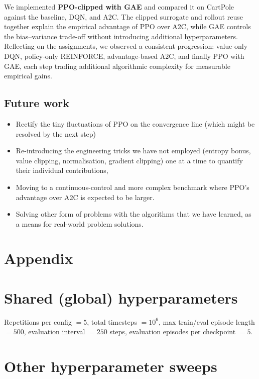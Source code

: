 \documentclass{article}
\theoremstyle{plain}
\theoremstyle{definition}
\theoremstyle{remark}
\begin{document}
We implemented \textbf{PPO-clipped with GAE} and compared it on CartPole against the baseline, DQN, and A2C. The clipped surrogate and rollout reuse together explain the empirical advantage of PPO over A2C, while GAE controls the bias--variance trade-off without introducing additional hyperparameters. Reflecting on the assignments, we observed a consistent progression: value-only DQN, policy-only REINFORCE, advantage-based A2C, and finally PPO with GAE, each step trading additional algorithmic complexity for measurable empirical gains.
\subsection{Future work}
\begin{itemize}
    \item Rectify the tiny fluctuations of PPO on the convergence line (which might be resolved by the next step)
    \item Re-introducing the engineering tricks we have not employed (entropy bonus, value clipping, normalisation, gradient clipping) one at a time to quantify their individual contributions,
    \item Moving to a continuous-control and more complex benchmark where PPO's advantage over A2C is expected to be larger.
    \item Solving other form of problems with the algorithms that we have learned, as a means for real-world problem solutions.
\end{itemize}
\clearpage
\nocite{*}



\clearpage
\section*{Appendix}
\appendix{}

\section{Shared (global) hyperparameters}

Repetitions per config $= 5$, total timesteps $= 10^{6}$, max train/eval episode length $= 500$, evaluation interval $= 250$ steps, evaluation episodes per checkpoint $= 5$.


\section{Other hyperparameter sweeps}\label{app:ppo_hyper}
\end{document}
